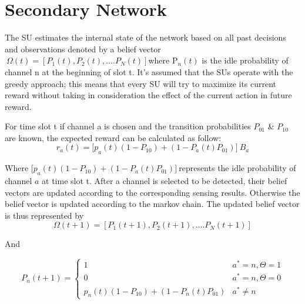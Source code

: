\documentclass[twocolumn]{el-author}
\begin{document}
	\section{Secondary Network}
	The SU estimates the internal state of the network based on all past decisions and observations denoted by a belief vector  ${\ }{\Omega }\left({t}\right)=\left[P_1\left(t\right),P_2\left(t\right),\dots .P_N\left(t\right)\right]$where P${}_{n}(t)$ is the idle probability of channel n at the beginning of slot t. 
	It's assumed that the SUs operate with the greedy approach; this means that every SU will try to maximize its current reward without taking in consideration the effect of the current action in future reward.
	
	For time slot t if channel a is chosen and the transition probabilities ${P}_{01}$ \& ${P}_{10}$ are known, the expected reward can be calculated as follow: 
	\begin{equation}\label{9}
	r_a(t)={[p}_a\left(t\right)\left(1-P_{10}\right)+\left(1-P_a\left(t\right)P_{01}\right)]\ B_a
	\end{equation}
	
	Where ${[p}_a\left(t\right)\left(1-P_{10}\right)+\left(1-P_a\left(t\right)P_{01}\right)]\ $represents the idle probability of channel $ a $ at time slot t.
	After a channel is selected to be detected, their belief vectors are updated according to the corresponding sensing results. Otherwise the belief vector is updated according to the markov chain. The updated belief vector is thus represented by 
	\begin{equation}\label{11}
	{\Omega }\left({t+1}\right)=\left[P_1\left(t+1\right),P_2\left(t+1\right),\dots .P_N\left(t+1\right)\right]
	\end{equation}
	
	And 
	
	\begin{equation}\label{12}
	P_n(t+1)=
	\begin{cases}
	1 & a^*=n, \Theta=1
	\\
	0 &  a^*=n, \Theta=0
	\\
	p_n(t)(1-P_{10})+(1-P_n(t)P_{01}) & a^*\neq n
	\end{cases}
	\end{equation}
	
\end{document}
